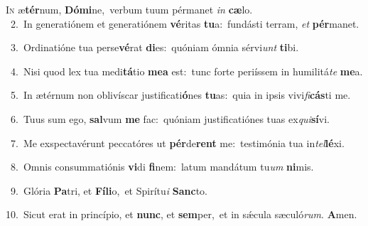 \lettrine{\initial\textcolor{\initialcolor}{I}}{n} æ\-\textbf{tér}\-num, \textbf{Dó}\-\textbf{mi}ne,~\star verbum tuum pérmanet \textit{in} \textbf{cæ}\-lo.\\
{\numbfont\textcolor{\numbcolor}{~2.}}~In generatiónem et generatiónem \textbf{vé}\-ritas \textbf{tu}\-a:~\star fundásti terram, \textit{et} \textbf{pér}\-manet.\par
{\numbfont\textcolor{\numbcolor}{~3.}}~Ordinatióne tua perse\-\textbf{vé}\-rat \textbf{di}\-es:~\star quóniam ómnia sérvi\textit{unt} \textbf{ti}\-bi.\par
{\numbfont\textcolor{\numbcolor}{~4.}}~Nisi quod lex tua medi\-\textbf{tá}\-tio \textbf{me}\-\textbf{a} est:~\star tunc forte periíssem in humilitá\textit{te} \textbf{me}\-a.\par
{\numbfont\textcolor{\numbcolor}{~5.}}~In ætérnum non oblivíscar justificati\-\textbf{ó}\-nes \textbf{tu}\-as:~\star quia in ipsis vivi\-\textit{fi}\-\textbf{cás}ti me.\par
{\numbfont\textcolor{\numbcolor}{~6.}}~Tuus sum ego, \textbf{sal}\-vum \textbf{me} fac:~\star quóniam justificatiónes tuas ex\-\textit{qui}\-\textbf{sí}vi.\par
{\numbfont\textcolor{\numbcolor}{~7.}}~Me exspectavérunt peccatóres ut \textbf{pér}\-de\textbf{rent} me:~\star testimónia tua in\-\textit{tel}\-\textbf{lé}xi.\par
{\numbfont\textcolor{\numbcolor}{~8.}}~Omnis consummatiónis \textbf{vi}\-di \textbf{fi}\-nem:~\star latum mandátum tu\textit{um} \textbf{ni}\-mis.\par
{\numbfont\textcolor{\numbcolor}{~9.}}~Glória \textbf{Pa}\-tri, et \textbf{Fí}\-\textbf{li}o,~\star et Spirítu\textit{i} \textbf{Sanc}\-to.\par
{\numbfont\textcolor{\numbcolor}{10.}}~Sicut erat in princípio, et \textbf{nunc}\-, et \textbf{sem}\-per,~\star et in sǽcula sæculó\-\textit{rum}\-. \textbf{A}\-men.\par
